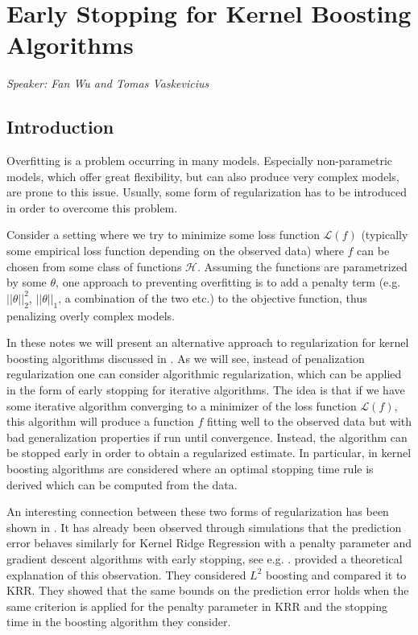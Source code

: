 
\chapter{Early Stopping for Kernel Boosting Algorithms}
\emph{Speaker: Fan Wu and Tomas Vaskevicius}\\


\section{Introduction}
Overfitting is a problem occurring in many models. Especially non-parametric models,
which offer great flexibility, but can also produce very complex models,
are prone to this issue. Usually, some form of regularization has to be introduced
in order to overcome this problem.

Consider a setting where we try to minimize some loss function $\mathcal{L}(f)$
(typically some empirical loss function depending on the observed data) where $f$
can be chosen from some class of functions $\mathcal{H}$. Assuming the
functions are parametrized by some $\theta$, one approach to preventing overfitting
is to add a penalty term (e.g. $||\theta||_2^2$, $||\theta||_1$, a combination of the two etc.)
to the objective function, thus penalizing overly complex models.

In these notes we will present an alternative approach to regularization for kernel boosting algorithms discussed in \cite{wain17ada}. As we will see, instead of penalization regularization one
can consider algorithmic regularization, which can be applied in the form of early stopping
for iterative algorithms. The idea is that if we have some iterative algorithm
converging to a minimizer of the loss function $\mathcal{L}(f)$, this algorithm will
produce a function $f$ fitting well to the observed data but with bad generalization properties
if run until convergence. Instead, the algorithm can be stopped early in order to obtain a regularized estimate.
In particular, in \cite{wain17ada} kernel boosting algorithms are considered
where an optimal stopping time rule is derived which can be computed from the data.

An interesting connection between these two forms of regularization has been shown in
\cite[Section 3.4]{raskutti2014early}.
It has already been observed through simulations that the prediction error behaves
similarly for Kernel Ridge Regression with a penalty parameter and gradient descent algorithms with early stopping, see e.g. \cite{friedman2004gradient}.
\cite{raskutti2014early} provided a theoretical explanation of this observation.
They considered $L^2$ boosting and compared it to KRR.
They showed that the same bounds on the prediction error holds when the same criterion
is applied for the penalty parameter in KRR and the stopping time in the boosting algorithm they consider.

